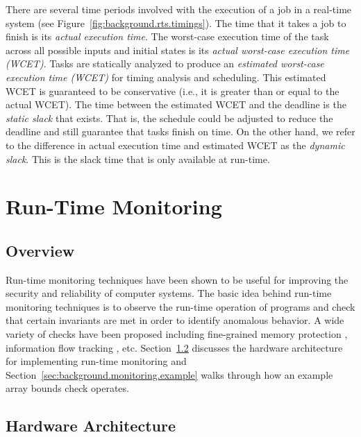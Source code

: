 There are several time periods involved with the execution of a job in a
real-time system (see Figure~\ref{fig:background.rts.timings}).
The time that it takes a
job to finish is its \emph{actual execution time}. The worst-case execution
time of the task across all possible inputs and initial states is its
\emph{actual worst-case execution time (WCET)}. Tasks are statically analyzed
to produce an \emph{estimated worst-case execution time (WCET)} for timing
analysis and scheduling. This estimated WCET is guaranteed to be conservative
(i.e., it is greater than or equal to the actual WCET).  The time between the
estimated WCET and the deadline is the \emph{static slack} that exists. That
is, the schedule could be adjusted to reduce the deadline and still guarantee
that tasks finish on time. On the other hand, we refer to the difference in
actual execution time and estimated WCET as the \emph{dynamic slack}. This is
the slack time that is only available at run-time.

\section{Run-Time Monitoring}
\label{sec:background.monitoring}

\subsection{Overview}

Run-time monitoring techniques have been shown to be useful for improving the
security and reliability of computer systems. The basic idea behind run-time
monitoring techniques is to observe the run-time operation of programs and
check that certain invariants are met in order to identify anomalous behavior. A wide
variety of checks have been proposed including fine-grained memory protection
\cite{mondrian-asplos02}, information flow tracking \cite{dift-asplos04,
testudo-micro08}, etc. Section~\ref{sec:background.monitoring.arch} discusses
the hardware architecture for implementing run-time monitoring and
Section~\ref{sec:background.monitoring.example} walks through how an example
array bounds check operates.

\subsection{Hardware Architecture}
\label{sec:background.monitoring.arch}

